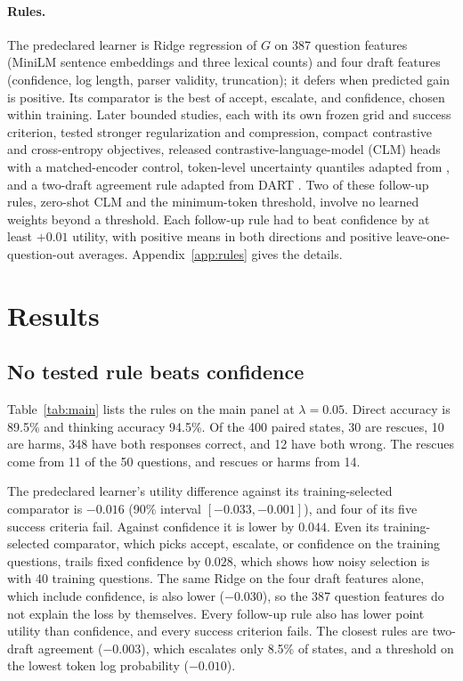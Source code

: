 \documentclass[10pt,letterpaper]{article}
\newcommand{\lam}{\lambda}
\begin{document}
\paragraph{Rules.} The predeclared learner is Ridge regression of $G$ on 387 question features (MiniLM sentence embeddings \citep{reimers2019sbert,wang2020minilm,sentencetransformersAllMiniLML6v2} and three lexical counts) and four draft features (confidence, log length, parser validity, truncation); it defers when predicted gain is positive. Its comparator is the best of accept, escalate, and confidence, chosen within training. Later bounded studies, each with its own frozen grid and success criterion, tested stronger regularization and compression, compact contrastive and cross-entropy objectives, released contrastive-language-model (CLM) heads \citep{kwok2026clm,contrastiveLM2026release} with a matched-encoder control, token-level uncertainty quantiles adapted from \citet{gupta2024lmcascades}, and a two-draft agreement rule adapted from DART \citep{lee2026dart}. Two of these follow-up rules, zero-shot CLM and the minimum-token threshold, involve no learned weights beyond a threshold. Each follow-up rule had to beat confidence by at least $+0.01$ utility, with positive means in both directions and positive leave-one-question-out averages. Appendix~\ref{app:rules} gives the details.

\section{Results}
\label{sec:results}

\subsection{No tested rule beats confidence}

Table~\ref{tab:main} lists the rules on the main panel at $\lam=0.05$. Direct accuracy is 89.5\% and thinking accuracy 94.5\%. Of the 400 paired states, 30 are rescues, 10 are harms, 348 have both responses correct, and 12 have both wrong. The rescues come from 11 of the 50 questions, and rescues or harms from 14.

The predeclared learner's utility difference against its training-selected comparator is $-0.016$ (90\% interval $[-0.033, -0.001]$), and four of its five success criteria fail. Against confidence it is lower by $0.044$. Even its training-selected comparator, which picks accept, escalate, or confidence on the training questions, trails fixed confidence by $0.028$, which shows how noisy selection is with 40 training questions. The same Ridge on the four draft features alone, which include confidence, is also lower ($-0.030$), so the 387 question features do not explain the loss by themselves. Every follow-up rule also has lower point utility than confidence, and every success criterion fails. The closest rules are two-draft agreement ($-0.003$), which escalates only 8.5\% of states, and a threshold on the lowest token log probability ($-0.010$).
\end{document}

